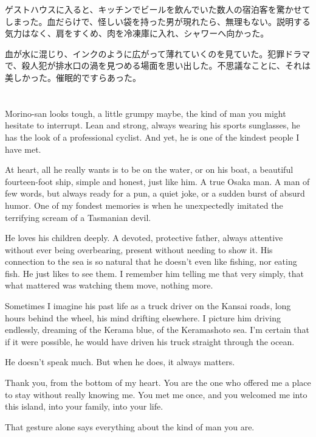 \documentclass[
  letterpaper,
  oneside]{scrbook}
\begin{document}
ゲストハウスに入ると、キッチンでビールを飲んでいた数人の宿泊客を驚かせてしまった。血だらけで、怪しい袋を持った男が現れたら、無理もない。説明する気力はなく、肩をすくめ、肉を冷凍庫に入れ、シャワーへ向かった。

血が水に混じり、インクのように広がって薄れていくのを見ていた。犯罪ドラマで、殺人犯が排水口の渦を見つめる場面を思い出した。不思議なことに、それは美しかった。催眠的ですらあった。


\chapter{}\label{section}

Morino-san looks tough, a little grumpy maybe, the kind of man you might
hesitate to interrupt. Lean and strong, always wearing his sports
sunglasses, he has the look of a professional cyclist. And yet, he is
one of the kindest people I have met.

At heart, all he really wants is to be on the water, or on his boat, a
beautiful fourteen-foot ship, simple and honest, just like him. A true
Osaka man. A man of few words, but always ready for a pun, a quiet joke,
or a sudden burst of absurd humor. One of my fondest memories is when he
unexpectedly imitated the terrifying scream of a Tasmanian devil.

He loves his children deeply. A devoted, protective father, always
attentive without ever being overbearing, present without needing to
show it. His connection to the sea is so natural that he doesn't even
like fishing, nor eating fish. He just likes to see them. I remember him
telling me that very simply, that what mattered was watching them move,
nothing more.

Sometimes I imagine his past life as a truck driver on the Kansai roads,
long hours behind the wheel, his mind drifting elsewhere. I picture him
driving endlessly, dreaming of the Kerama blue, of the Keramashoto sea.
I'm certain that if it were possible, he would have driven his truck
straight through the ocean.

He doesn't speak much. But when he does, it always matters.

Thank you, from the bottom of my heart. You are the one who offered me a
place to stay without really knowing me. You met me once, and you
welcomed me into this island, into your family, into your life.

That gesture alone says everything about the kind of man you are.
\end{document}
